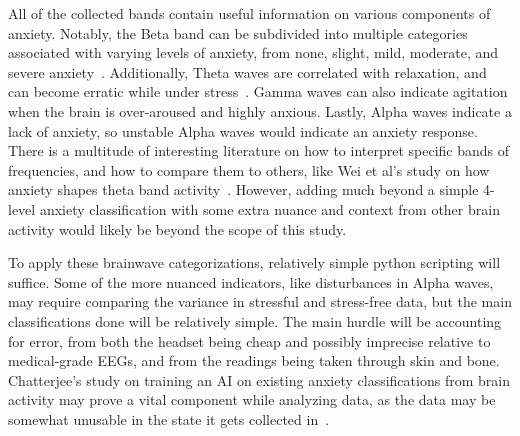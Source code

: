 \documentclass[journal]{IEEEtran}
\begin{document}
All of the collected bands contain useful information on various components of anxiety. Notably, the Beta band can be subdivided into multiple categories associated with varying levels of anxiety, from none, slight, mild, moderate, and severe anxiety~\cite{ChatterjeeDebatri2023Doms}. Additionally, Theta waves are correlated with relaxation, and can become erratic while under stress~\cite{neurohealth_2019}. Gamma waves can also indicate agitation when the brain is over-aroused and highly anxious. Lastly, Alpha waves indicate a lack of anxiety, so unstable Alpha waves would indicate an anxiety response. There is a multitude of interesting literature on how to interpret specific bands of frequencies, and how to compare them to others, like Wei et al's study on how anxiety shapes theta band activity~\cite{wei_sun_long_2025}. However, adding much beyond a simple 4-level anxiety classification with some extra nuance and context from other brain activity would likely be beyond the scope of this study.

To apply these brainwave categorizations, relatively simple python scripting will suffice. Some of the more nuanced indicators, like disturbances in Alpha waves, may require comparing the variance in stressful and stress-free data, but the main classifications done will be relatively simple. The main hurdle will be accounting for error, from both the headset being cheap and possibly imprecise relative to medical-grade EEGs, and from the readings being taken through skin and bone. Chatterjee's study on training an AI on existing anxiety classifications from brain activity may prove a vital component while analyzing data, as the data may be somewhat unusable in the state it gets collected in~\cite{ChatterjeeDebatri2023Doms}.
\end{document}
